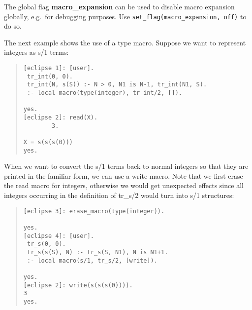 The global flag {\bf macro_expansion} can be used to disable
macro expansion globally, e.g.\ for debugging purposes.
Use {\tt set_flag(macro_expansion, off)} to do so.

The next example shows the use of a type macro. Suppose we want to represent
integers as s/1 terms:
\begin{quote} \begin{verbatim}
[eclipse 1]: [user].
 tr_int(0, 0).
 tr_int(N, s(S)) :- N > 0, N1 is N-1, tr_int(N1, S).
 :- local macro(type(integer), tr_int/2, []).

yes.
[eclipse 2]: read(X).
        3.

X = s(s(s(0)))
yes.
\end{verbatim} \end{quote}
When we want to convert the s/1 terms back to normal integers so that they
are printed in the familiar form, we can use a write macro.
Note that we first erase the read macro for integers, otherwise we would get
unexpected effects since all integers occurring in the definition of
tr_s/2 would turn into s/1 structures:
\begin{quote} \begin{verbatim}
[eclipse 3]: erase_macro(type(integer)).

yes.
[eclipse 4]: [user].
 tr_s(0, 0).
 tr_s(s(S), N) :- tr_s(S, N1), N is N1+1.
 :- local macro(s/1, tr_s/2, [write]).

yes.
[eclipse 2]: write(s(s(s(0)))).
3
yes.
\end{verbatim} \end{quote}

